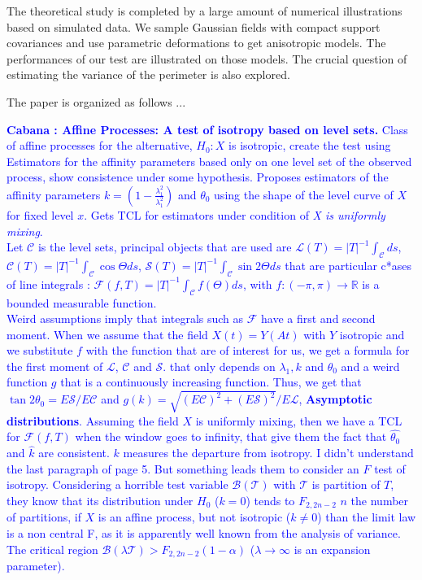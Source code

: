 \documentclass[12pt]{article}
\renewcommand{\hat}{\widehat}
\theoremstyle{Theorem}
\theoremstyle{definition}
\begin{document}
The theoretical study is completed by a large amount of numerical illustrations based on simulated data. We sample Gaussian fields with compact support covariances and use parametric deformations to get anisotropic models. The performances of our test are illustrated on those models. The crucial question of estimating the variance of the perimeter is also explored.

\bigskip

{\sc The paper is organized as follows ...}

\bigskip
\bigskip


\textcolor{blue}{
\textbf{Cabana : Affine Processes: A test of isotropy based on level sets.} 
Class of affine processes for the alternative, $H_{0} :X$ is isotropic, create the test using Estimators for the affinity parameters based only on one level set of the observed process, show consistence under some hypothesis. Proposes estimators of the affinity parameters $k = (1 - \frac{\lambda_{1}^{2}}{\lambda_{1}^{2}})$ and $\theta_{0}$ using the shape of the level curve of $X$ for fixed level $x$. Gets TCL for estimators under condition of \textit{X is uniformly mixing}. \\
Let $\mathscr{C}$ is the level sets, principal objects that are used are $\mathscr{L}(T) = |T|^{-1}\int_{\mathscr{C}}ds$, $\mathscr{C}(T) = |T|^{-1}\int_{\mathcal{C}} \cos\Theta ds$, $\mathscr{S}(T) = |T|^{-1}\int_{\mathscr{C}} \sin2\Theta ds$ that are particular c*ases of line integrals : $\mathscr{F}(f, T) = |T|^{-1}\int_{\mathscr{C}}f(\Theta)ds$, with $f:(-\pi, \pi) \to \mathbb{R}$ is a bounded measurable function.\\
Weird assumptions imply that integrals such as $\mathscr{F}$ have a first and second moment. When we assume that the field $X(t) = Y(At)$ with $Y$ isotropic and we substitute $f$ with the function that are of interest for us, we get a formula for the first moment of $\mathscr{L}$, $\mathscr{C}$ and $\mathscr{S}$. that only depends on $\lambda_{1}, k$ and $\theta_{0}$ and a weird function $g$ that is a continuously increasing function. Thus, we get that $\tan 2\theta_{0} = E\mathscr{S}/E\mathscr{C}$ and $g(k) = \sqrt{(E\mathscr{C})^2 + (E\mathscr{S})^2}/E\mathscr{L}$, \textbf{Asymptotic distributions}. Assuming the field $X$ is uniformly mixing, then we have a TCL for $\mathscr{F}(f, T)$ when the window goes to infinity, that give them the fact that $\hat{\theta_{0}}$ and $\hat{k}$ are consistent. $k$ measures the departure from isotropy. I didn't understand the last paragraph of page 5. But something leads them to consider an $F$ test of isotropy. Considering a horrible test variable $\mathscr{B}(\mathscr{T})$ with $\mathscr{T}$ is partition of $T$, they know that its distribution under $H_{0}$ ($k = 0$) tends to $F_{2, 2n-2}$ $n$ the number of partitions, if $X$ is an affine process, but not isotropic ($k \neq 0$) than the limit law is a non central F, as it is apparently well known from the analysis of variance. The critical region $\mathscr{B}(\lambda \mathscr{T}) > F_{2, 2n-2}(1-\alpha)$ ($\lambda \to \infty$ is an expansion parameter). \\
}
\end{document}
